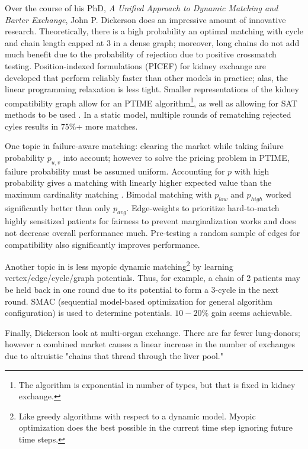 \documentclass[main.tex]{subfiles}
\begin{document}
Over the course of his PhD, \textit{A Unified Approach to Dynamic Matching and Barter Exchange}, John P. Dickerson \cite{Dick} does an impressive amount of innovative research. Theoretically, there is a high probability an optimal matching with cycle and chain length capped at 3 in a dense graph; moreover, long chains do not add much benefit due to the probability of rejection due to positive crossmatch testing. Position-indexed formulations (PICEF) for kidney exchange \cite{Dick} \cite{Dick1} are developed that perform reliably faster than other models in practice; alas, the linear programming relaxation is less tight. Smaller representations of the kidney compatibility graph allow for an PTIME algorithm\footnote{The algorithm is exponential in number of types, but that is fixed in kidney exchange.}, as well as allowing for SAT methods to be used \cite{Dick} \cite{Dick2}. In a static model, multiple rounds of rematching rejected cyles results in $75\%$+ more matches.

One topic in \cite{Dick} failure-aware matching: clearing the market while taking failure probability $p_{u,v}$ into account; however to solve the pricing problem in PTIME, failure probability must be assumed uniform. Accounting for $p$ with high probability gives a matching with linearly higher expected value than the maximum cardinality matching \cite{Dick} \cite{Dick3}. Bimodal matching with $p_{low}$ and $p_{high}$ worked significantly better than only $p_{avg}$. Edge-weights to prioritize hard-to-match highly sensitized patients for fairness to prevent marginalization works and does not decrease overall performance much. Pre-testing a random sample of edges for compatibility also significantly improves performance.

Another topic in \cite{Dick} is less myopic dynamic matching\footnote{Like greedy algorithms with respect to a dynamic model. Myopic optimization does the best possible in the current time step ignoring future time steps.} by learning vertex/edge/cycle/graph potentials. Thus, for example, a chain of 2 patients may be held back in one round due to its potential to form a 3-cycle in the next round. SMAC (sequential model-based optimization for general algorithm configuration) \cite{Hut1} is used to determine potentials. $10-20\%$ gain seems achievable.

Finally, Dickerson \cite{Dick} \cite{Dick4} look at multi-organ exchange. There are far fewer lung-donors; however a combined market causes a linear increase in the number of exchanges due to altruistic "chains that thread through the liver pool."
\end{document}
